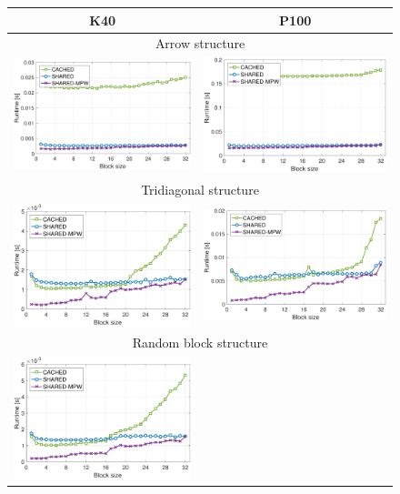 \begin{figure}
\begin{center}
{\scriptsize
\begin{tabular}{cc}
K40 & P100\\
\hline
\multicolumn{2}{c}{Arrow structure}\\
\includegraphics[width=.46\columnwidth]{plots/ARR_bjp_setup_bs_d_K40.pdf}
&
\includegraphics[width=.46\columnwidth]{plots/ARR_bjp_setup_bs_d_P100.pdf}\\
\hline
\multicolumn{2}{c}{Tridiagonal structure}\\
\includegraphics[width=.46\columnwidth]{plots/TDG_bjp_setup_bs_d_K40.pdf}
&
\includegraphics[width=.46\columnwidth]{plots/TDG_bjp_setup_bs_d_P100.pdf}\\
\hline
\multicolumn{2}{c}{Random block structure}\\
\includegraphics[width=.46\columnwidth]{plots/RND_bjp_setup_bs_d_K40.pdf}

\end{tabular}}
\end{center}
\end{figure}
